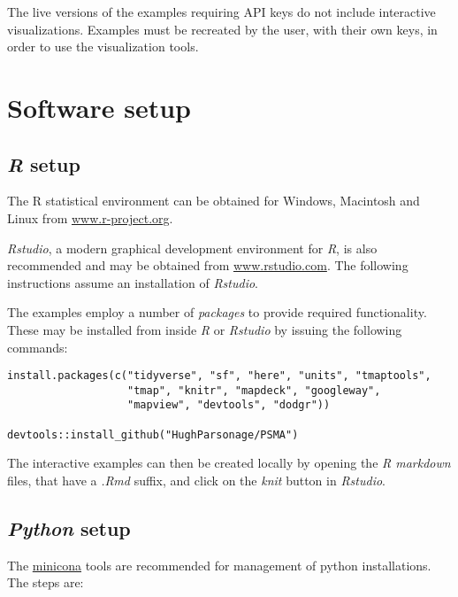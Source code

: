 \documentclass[utf8]{frontiers_suppmat} %
\begin{document}
The live versions of the examples requiring API keys do not include interactive visualizations. Examples must be
recreated by the user, with their own keys, in order to use the visualization tools.

\section{Software setup}
\subsection{{\em R} setup}

The R statistical environment can be obtained for Windows, Macintosh
and Linux from
\href{http://cran.r-project.org/mirrors.html}{www.r-project.org}.

{\em Rstudio}, a modern graphical development environment for {\em R},
is also recommended and may be obtained from
\href{https://www.rstudio.com/products/rstudio/download/}{www.rstudio.com}. The
following instructions assume an installation of {\em Rstudio}.

The examples employ a number of {\em packages} to provide required
functionality. These may be installed from inside {\em R} or {\em
  Rstudio} by issuing the following commands:

\begin{verbatim}
install.packages(c("tidyverse", "sf", "here", "units", "tmaptools", 
                   "tmap", "knitr", "mapdeck", "googleway",
                   "mapview", "devtools", "dodgr"))

devtools::install_github("HughParsonage/PSMA")
\end{verbatim}

The interactive examples can then be created locally by opening the
{\em R markdown} files, that have a {\em .Rmd} suffix, and click on
the {\em knit} button in {\em Rstudio}.

\subsection{{\em Python} setup}

The \href{https://docs.conda.io/en/latest/miniconda.html}{minicona} tools are
recommended for management of python installations. The steps are:
\end{document}
